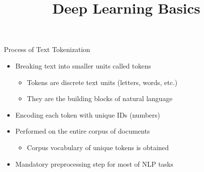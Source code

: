 



\newcommand{\titlefigure}{figure/tokenization.jpeg}
\newcommand{\learninggoals}{
\item Understand the the process of text tokenization
\item Learn the various types of text tokenization}

\title{Deep Learning Basics}
\date{}




\begin{vbframe}{Process of Text Tokenization}

\vfill

\begin{itemize}
	\item Breaking text into smaller units called tokens
		\begin{itemize}
			\item Tokens are discrete text units (letters, words, etc.)
			\item They are the building blocks of natural language
		\end{itemize}
	\item Encoding each token with unique IDs (numbers)
	\item Performed on the entire corpus of documents
		\begin{itemize}
			\item Corpus vocabulary of unique tokens is obtained
		\end{itemize}
	\item Mandatory preprocessing step for most of NLP tasks

\end{itemize}

\vfill

\end{vbframe}


